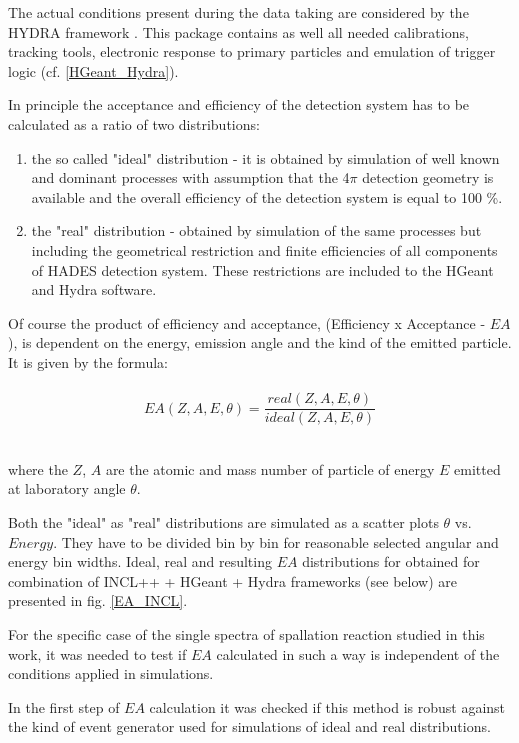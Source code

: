 The actual conditions present during the data taking are considered by the HYDRA framework \cite{HYDRA}. 
This package contains as well all needed calibrations, tracking 
tools, electronic response to primary particles and emulation of trigger logic (cf. \ref{HGeant_Hydra}). 

In principle the acceptance and efficiency of the detection system has to be calculated as a ratio of two distributions:
\begin{enumerate}
\item the so called "ideal" distribution - it is obtained by simulation of well known and dominant processes 
with assumption that the 4$\pi$ detection geometry is available and the overall efficiency 
of the detection system is equal to 100 \%.  
\item the "real" distribution - obtained by simulation of the same processes but including the geometrical restriction 
and finite efficiencies of all components of HADES detection system. These restrictions are included 
to the HGeant and Hydra software.
\end{enumerate}

Of course the product of efficiency and acceptance,
(Efficiency x Acceptance - $EA$), is dependent on the energy, emission angle and the kind of the emitted particle. It is given by the formula:\\
 \ \\
\begin{equation}
\label{EA_eq}
    EA(Z, A, E, \theta) = \frac{real(Z, A, E, \theta)}{ideal(Z, A, E, \theta)}
\end{equation}

 \ \\
where the $Z$, $A$ are the atomic and mass number of particle of energy $E$ emitted at laboratory angle $\theta$.

Both the "ideal" as "real" distributions are simulated as a scatter plots $\theta$ vs. $Energy$. They have to be divided bin by bin for reasonable selected angular and energy bin widths.
Ideal, real and resulting $EA$ distributions for obtained for combination of INCL++ + HGeant + Hydra frameworks (see below) 
are presented in fig. \ref{EA_INCL}. 

For the specific case of the single spectra of spallation reaction studied in this work, 
it was needed to test if $EA$ calculated in such a way is independent of the conditions applied in simulations.

In the first step of $EA$ calculation it was checked if 
this method is robust against the kind of event generator used for simulations 
of ideal and real distributions.

